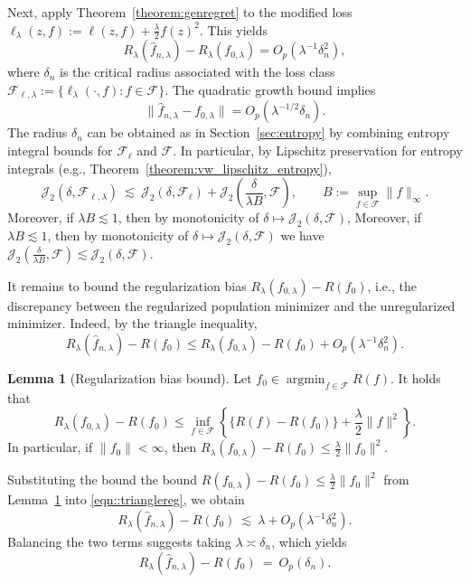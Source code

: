 \documentclass[11pt]{article}
\theoremstyle{plain}
\theoremstyle{definition} %
\newtheorem{lemma}{Lemma}
\DeclareMathOperator*{\argmin}{argmin}
\begin{document}
Next, apply Theorem~\ref{theorem:genregret} to the modified loss
\(\ell_{\lambda}(z,f) := \ell(z,f) + \tfrac{\lambda}{2} f(z)^2\). This yields
\[
R_\lambda(\hat f_{n,\lambda})-R_\lambda(f_{0,\lambda})
=
O_p\left(\lambda^{-1}\delta_n^2\right),
\]
where \(\delta_n\) is the critical radius associated with the loss class
\(\mathcal{F}_{\ell,\lambda} := \{\ell_{\lambda}(\cdot,f): f \in \mathcal{F}\}\). The quadratic growth bound implies
\[
\| \hat f_{n,\lambda}-f_{0,\lambda}\|
=
O_p\left(\lambda^{-1/2}\delta_n\right).
\] The radius $\delta_n$
can be obtained as in Section~\ref{sec:entropy} by combining entropy integral bounds for
$\mathcal{F}_{\ell}$ and $\mathcal{F}$. In particular, by Lipschitz preservation for entropy integrals
(e.g., Theorem~\ref{theorem:vw_lipschitz_entropy}),
\[
\mathcal{J}_2(\delta, \mathcal{F}_{\ell,\lambda})
\ \lesssim\
\mathcal{J}_2(\delta, \mathcal{F}_{\ell})
+
\mathcal{J}_2\left(\frac{\delta}{\lambda B}, \mathcal{F}\right),
\qquad
B := \sup_{f \in \mathcal{F}}\|f\|_{\infty}.
\]
Moreover, if $\lambda B \lesssim 1$, then by monotonicity of $\delta\mapsto\mathcal J_2(\delta,\mathcal F)$,
Moreover, if $\lambda B \lesssim 1$, then by monotonicity of $\delta\mapsto\mathcal J_2(\delta,\mathcal F)$ we have
\(\mathcal{J}_2\left(\tfrac{\delta}{\lambda B}, \mathcal{F}\right)\lesssim \mathcal{J}_2(\delta, \mathcal{F})\).



It remains to bound the regularization bias $R_\lambda(f_{0,\lambda})-R(f_0)$, i.e., the discrepancy between
the regularized population minimizer and the unregularized minimizer. Indeed, by the triangle
inequality,
\begin{equation}
\label{eqn::trianglereg}
    R_\lambda(\hat f_{n,\lambda})-R(f_0)
\le
R_\lambda(f_{0,\lambda})-R(f_0)
+
O_p\left(\lambda^{-1}\delta_n^2\right).
\end{equation}




\begin{lemma}[Regularization bias bound]
\label{lem:tikhonov_bias_variational}
Let $f_0 \in \argmin_{f \in \mathcal{F}} R(f)$. It holds that 
\[
R_\lambda(f_{0,\lambda})-R(f_0)
\le
\inf_{f \in \mathcal{F}} \left\{\{R(f)-R(f_0)\}+\frac{\lambda}{2}\|f\|^2\right\}.
\]
In particular, if $\|f_0\|<\infty$, then $R_\lambda(f_{0,\lambda})-R(f_0)\le \frac{\lambda}{2}\|f_0\|^2.$
\end{lemma}


Substituting the bound the bound $R(f_{0,\lambda})-R(f_0)\le \frac{\lambda}{2}\|f_0\|^2$ from Lemma~\ref{lem:tikhonov_bias_variational} into \eqref{eqn::trianglereg}, we obtain
\[
    R_\lambda(\hat f_{n,\lambda})-R(f_0)
\ \lesssim\
\lambda
+
O_p\left(\lambda^{-1}\delta_n^2\right).
\]
Balancing the two terms suggests taking $\lambda\asymp \delta_n$, which yields
\[
    R_\lambda(\hat f_{n,\lambda})-R(f_0)
\ =\
O_p(\delta_n).
\]
\end{document}

